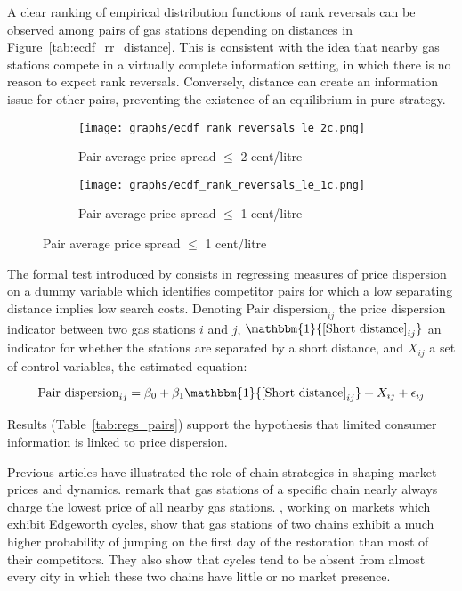 \documentclass[english]{article}
\begin{document}
A clear ranking of empirical distribution functions of rank reversals can be observed among pairs of gas stations depending on distances in Figure~\ref{tab:ecdf_rr_distance}. This is consistent with the idea that nearby gas stations compete in a virtually complete information setting, in which there is no reason to expect rank reversals. Conversely, distance can create an information issue for other pairs, preventing the existence of an equilibrium in pure strategy.

\begin{figure}[H]
\centering
\caption{Empirical distribution functions of rank reversals}
\label{tab:ecdf_rr_distance}
\begin{subfigure}{.49\textwidth}
\centering
\texttt{[image: graphs/ecdf\_rank\_reversals\_le\_2c.png]}
\caption[short]{Pair average price spread $\le$ 2 cent/litre}
\end{subfigure}
\begin{subfigure}{.49\textwidth}
\centering
\texttt{[image: graphs/ecdf\_rank\_reversals\_le\_1c.png]}
\caption[short]{Pair average price spread $\le$ 1 cent/litre}
\end{subfigure}
\end{figure}

The formal test introduced by \cite{TAP11} consists in regressing measures of price dispersion on a dummy variable which identifies competitor pairs for which a low separating distance implies low search costs. Denoting $\text{Pair dispersion}_{ij}$ the price dispersion indicator between two gas stations $i$ and $j$, $\mathbbm{1}{\text{[Short distance]}_{ij}}$ an indicator for whether the stations are separated by a short distance, and $X_{ij}$ a set of control variables, the estimated equation:

\begin{equation}
\text{Pair dispersion}_{ij}= \beta_0 + \beta_1 \mathbbm{1}{\text{[Short distance]}_{ij}} + X_{ij} + \epsilon_{ij}
\end{equation}

Results (Table~\ref{tab:regs_pairs}) support the hypothesis that limited consumer information is linked to price dispersion.

Previous articles have illustrated the role of chain strategies in shaping market prices and dynamics. \cite{HOS08} remark that gas stations of a specific chain nearly always charge the lowest price of all nearby gas stations. \cite{LEW12}, working on markets which exhibit Edgeworth cycles, show that gas stations of two chains exhibit a much higher probability of jumping on the first day of the restoration than most of their competitors. They also show that cycles tend to be absent from almost every city in which these two chains have little or no market presence.
\end{document}

